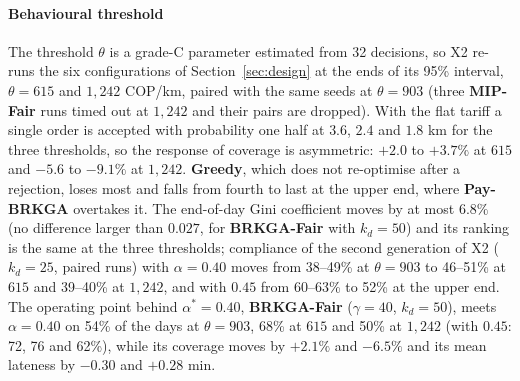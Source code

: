 \documentclass[a4paper,11pt,review,3p,authoryear]{elsarticle}
\begin{document}
\paragraph{Behavioural threshold} The threshold $\theta$ is a grade-C parameter estimated from 32 decisions, so X2 re-runs the six configurations of Section~\ref{sec:design} at the ends of its 95\% interval, $\theta = 615$ and $1{,}242$ COP/km, paired with the same seeds at $\theta = 903$ (three \textbf{MIP-Fair} runs timed out at $1{,}242$ and their pairs are dropped). With the flat tariff a single order is accepted with probability one half at $3.6$, $2.4$ and $1.8$ km for the three thresholds, so the response of coverage is asymmetric: $+2.0$ to $+3.7\%$ at $615$ and $-5.6$ to $-9.1\%$ at $1{,}242$. \textbf{Greedy}, which does not re-optimise after a rejection, loses most and falls from fourth to last at the upper end, where \textbf{Pay-BRKGA} overtakes it. The end-of-day Gini coefficient moves by at most $6.8\%$ (no difference larger than $0.027$, for \textbf{BRKGA-Fair} with $k_d = 50$) and its ranking is the same at the three thresholds; compliance of the second generation of X2 ($k_d = 25$, paired runs) with $\alpha = 0.40$ moves from 38--49\% at $\theta = 903$ to 46--51\% at $615$ and 39--40\% at $1{,}242$, and with $0.45$ from 60--63\% to 52\% at the upper end. The operating point behind $\alpha^* = 0.40$, \textbf{BRKGA-Fair} ($\gamma = 40$, $k_d = 50$), meets $\alpha = 0.40$ on 54\% of the days at $\theta = 903$, 68\% at $615$ and 50\% at $1{,}242$ (with $0.45$: 72, 76 and 62\%), while its coverage moves by $+2.1\%$ and $-6.5\%$ and its mean lateness by $-0.30$ and $+0.28$ min.
\end{document}

